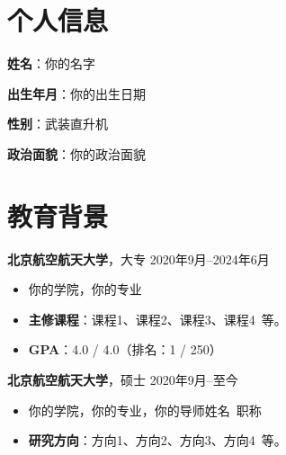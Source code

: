 \documentclass[11pt]{article}
\newlength{\iconwidth}
\begin{document}
    \begin{minipage}[t]{0.78\textwidth}
        \begin{minipage}[t]{\textwidth}
        \section[个人信息]{\makebox[\iconwidth][c]{\color{primary_color}{\faAddressCard}}\quad 个人信息}
        \begin{minipage}[t]{0.5\textwidth}
            \textbf{姓\qquad 名}：你的名字
            
            \vspace{0.5em}
            \textbf{出生年月}：你的出生日期
        \end{minipage}
        \begin{minipage}[t]{0.35\textwidth}
            \textbf{性\qquad 别}：武装直升机
            
            \vspace{0.5em}
            \textbf{政治面貌}：你的政治面貌
        \end{minipage}
        \vspace{1.2em}
        \end{minipage}

        \begin{minipage}[t]{\textwidth}
        \section[教育背景]{\makebox[\iconwidth][c]{\color{primary_color}{\faGraduationCap}}\quad 教育背景}
        
        \vspace{0.5em}
        {\large \textbf{北京航空航天大学}}，大专 \hfill 2020年9月--2024年6月
        \begin{itemize}
            \item 你的学院，你的专业
            \item \textbf{主修课程}：课程1、课程2、课程3、课程4\ 等。
            \item \textbf{GPA}：4.0 / 4.0（排名：1 / 250）
        \end{itemize}
        
        \vspace{0.5em}
        {\large \textbf{北京航空航天大学}}，硕士 \hfill 2020年9月--至今
        \begin{itemize}
            \item 你的学院，你的专业，你的导师姓名\ 职称
            \item \textbf{研究方向}：方向1、方向2、方向3、方向4\ 等。
        \end{itemize}
        
        \vspace{1.2em}
        \end{minipage}
    \end{minipage}
\end{document}
